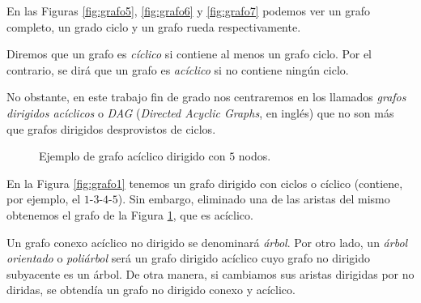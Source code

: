 \begin{exampleth}
En las Figuras \ref{fig:grafo5}, \ref{fig:grafo6} y \ref{fig:grafo7} podemos ver un grafo completo, un grado ciclo y un grafo rueda respectivamente.
\end{exampleth}

\begin{definition}\label{def:cyclic}
Diremos que un grafo es \emph{cíclico} si contiene al menos un grafo ciclo. Por el contrario, se dirá que un grafo es \emph{acíclico} si no contiene ningún ciclo.

No obstante, en este trabajo fin de grado nos centraremos en los llamados \emph{grafos dirigidos acíclicos} o \emph{DAG} (\emph{Directed Acyclic Graphs}, en inglés) que no son más que grafos dirigidos desprovistos de ciclos.
\end{definition}

\begin{figure}[H]
\centering
{}
\caption{Ejemplo de grafo acíclico dirigido con $5$ nodos.}
\label{fig:grafo8}
\end{figure}

\begin{exampleth}
En la Figura \ref{fig:grafo1} tenemos un grafo dirigido con ciclos o cíclico (contiene, por ejemplo, el $1$-$3$-$4$-$5$). Sin embargo, eliminado una de las aristas del mismo obtenemos el grafo de la Figura \ref{fig:grafo8}, que es acíclico. 
\end{exampleth}

\begin{definition}
Un grafo conexo acíclico no dirigido se denominará \emph{árbol}. Por otro lado, un \emph{árbol orientado} o \emph{poliárbol} será un grafo dirigido acíclico cuyo grafo no dirigido subyacente es un árbol. De otra manera, si cambiamos sus aristas dirigidas por no diridas, se obtendía un grafo no dirigido conexo y acíclico.
\end{definition}

